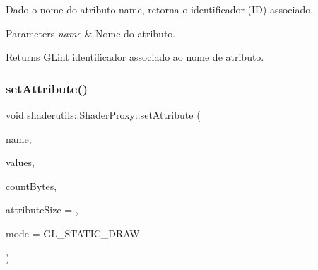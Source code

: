 Dado o nome do atributo {\ttfamily name}, retorna o identificador (ID) associado. 
\begin{DoxyParams}{Parameters}
{\em name} & Nome do atributo. \\
\hline
\end{DoxyParams}
\begin{DoxyReturn}{Returns}
G\+Lint identificador associado ao nome de atributo. 
\end{DoxyReturn}
\mbox{\label{classshaderutils_1_1_shader_proxy_aa870e4941cb9549f17850b82fc5c93b7}} 
\subsubsection{\texorpdfstring{set\+Attribute()}{setAttribute()}}
{\footnotesize\ttfamily void shaderutils\+::\+Shader\+Proxy\+::set\+Attribute (\begin{DoxyParamCaption}\item[{const char $\ast$}]{name,  }\item[{G\+Lfloat $\ast$}]{values,  }\item[{G\+Luint}]{count\+Bytes,  }\item[{G\+Luint}]{attribute\+Size = {},  }\item[{G\+Lenum}]{mode = {\ttfamily GL\+\_\+STATIC\+\_\+DRAW} }\end{DoxyParamCaption})\hspace{0.3cm}{\ttfamily [inline]}}

